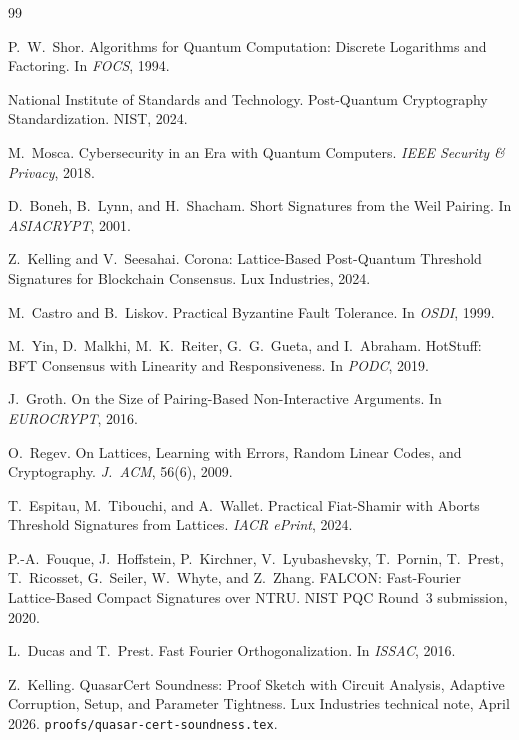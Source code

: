 
\begin{thebibliography}{99}

P.~W.~Shor.
\newblock Algorithms for Quantum Computation: Discrete Logarithms and
  Factoring.
\newblock In \emph{FOCS}, 1994.

{National Institute of Standards and Technology}.
\newblock Post-Quantum Cryptography Standardization.
\newblock NIST, 2024.

M.~Mosca.
\newblock Cybersecurity in an Era with Quantum Computers.
\newblock \emph{IEEE Security \& Privacy}, 2018.

D.~Boneh, B.~Lynn, and H.~Shacham.
\newblock Short Signatures from the Weil Pairing.
\newblock In \emph{ASIACRYPT}, 2001.

Z.~Kelling and V.~Seesahai.
\newblock Corona: Lattice-Based Post-Quantum Threshold Signatures for
  Blockchain Consensus.
\newblock Lux Industries, 2024.

M.~Castro and B.~Liskov.
\newblock Practical Byzantine Fault Tolerance.
\newblock In \emph{OSDI}, 1999.

M.~Yin, D.~Malkhi, M.~K.~Reiter, G.~G.~Gueta, and I.~Abraham.
\newblock HotStuff: BFT Consensus with Linearity and Responsiveness.
\newblock In \emph{PODC}, 2019.

J.~Groth.
\newblock On the Size of Pairing-Based Non-Interactive Arguments.
\newblock In \emph{EUROCRYPT}, 2016.

O.~Regev.
\newblock On Lattices, Learning with Errors, Random Linear Codes, and
  Cryptography.
\newblock \emph{J.~ACM}, 56(6), 2009.

T.~Espitau, M.~Tibouchi, and A.~Wallet.
\newblock Practical Fiat-Shamir with Aborts Threshold Signatures from
  Lattices.
\newblock \emph{IACR ePrint}, 2024.

P.-A.~Fouque, J.~Hoffstein, P.~Kirchner, V.~Lyubashevsky, T.~Pornin,
  T.~Prest, T.~Ricosset, G.~Seiler, W.~Whyte, and Z.~Zhang.
\newblock FALCON: Fast-Fourier Lattice-Based Compact Signatures over NTRU.
\newblock NIST PQC Round~3 submission, 2020.

L.~Ducas and T.~Prest.
\newblock Fast Fourier Orthogonalization.
\newblock In \emph{ISSAC}, 2016.

Z.~Kelling.
\newblock QuasarCert Soundness: Proof Sketch with Circuit Analysis,
  Adaptive Corruption, Setup, and Parameter Tightness.
\newblock Lux Industries technical note, April 2026.
\newblock \texttt{proofs/quasar-cert-soundness.tex}.

\end{thebibliography}

\appendix

